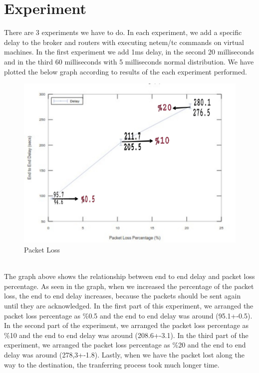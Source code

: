 \documentclass[conference]{IEEEtran}
\begin{document}
\section{Experiment}
There are 3 experiments we have to do. In each experiment, we add a specific delay to the broker and routers with executing netem/tc commands on virtual machines. In the first experiment we add 1ms delay, in the second 20 milliseconds and in the third 60 milliseconds with 5 milliseconds normal distribution.
We have plotted the below graph according to results of the each experiment performed. \\
\begin{figure}[ht]
  \includegraphics[width=\linewidth]{loss.jpeg}
  \caption{Packet Loss}
  \label{fig:boat1}
\end{figure}\\

The graph above shows the relationship between end to end delay and packet loss percentage. As seen in the graph, when we increased the percentage of the packet loss, the end to end delay increases, because the packets should be sent again until they are acknowledged. In the first part of this experiment, we arranged the packet loss percentage as \%0.5 and the end to end delay was around (95.1+-0.5). In the second part of the experiment, we arranged the packet loss percentage as \%10 and the end to end delay was around (208.6+-3.1). In the third part of the experiment, we arranged the packet loss percentage as \%20 and the end to end delay was around (278,3+-1.8). Lastly, when we have the packet lost along the way to the destination, the tranferring process took much longer time. 
\end{document}
